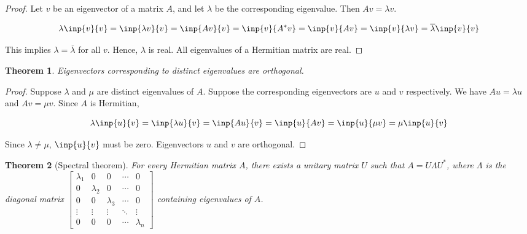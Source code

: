 \documentclass[twoside]{article}
\newcommand*\conj[1]{\overline{#1}}
\newcommand*\adj[1]{#1^*}
\theoremstyle{plain}
\newtheorem{theorem}{Theorem}
\theoremstyle{definition}
\theoremstyle{remark}
\begin{document}
\begin{proof}
Let \(v\) be an eigenvector of a matrix \(A\), and let \(\lambda\) be the corresponding eigenvalue. Then \(Av = \lambda v\). 

\[ \lambda\inp{v}{v} = \inp{\lambda v}{v} =  \inp{Av}{v} = \inp{v}{\adj{A}v} = \inp{v}{Av} = \inp{v}{\lambda v} = \conj{\lambda} \inp{v}{v}\]

This implies \(\lambda = \conj{\lambda}\) for all \(v\). Hence, \(\lambda\) is real. All eigenvalues of a Hermitian matrix are real.
 \end{proof}



\begin{theorem} Eigenvectors corresponding to distinct eigenvalues are orthogonal.\end{theorem}

\begin{proof} Suppose \(\lambda\) and \(\mu\) are distinct eigenvalues of \(A\). Suppose the corresponding eigenvectors are \(u\) and \(v\) respectively. We have \(Au = \lambda u\) and \(Av = \mu v\). Since \(A\) is Hermitian, 

\[ \lambda \inp{u}{v} = \inp{\lambda u}{v} = \inp{A u}{v} = \inp{u}{Av} = \inp{u}{\mu v} = \mu \inp{u}{v} \]

Since \(\lambda \ne \mu\), \(\inp{u}{v}\) must be zero. Eigenvectors \(u\) and \(v\) are orthogonal.

\end{proof}




\begin{theorem}[Spectral theorem]  For every Hermitian matrix \(A\), there exists a unitary matrix \(U\) such that \(A = U \Lambda \adj{U}\), where \(\Lambda\) is the diagonal matrix \(\begin{bmatrix}
\lambda_1 & 0 & 0 & \cdots & 0\\
0 & \lambda_2 & 0 & \cdots & 0\\
0 & 0 & \lambda_3 & \cdots & 0\\
\vdots & \vdots & \vdots & \ddots & \vdots \\
0 & 0 & 0 & \cdots & \lambda_n \end{bmatrix}\) containing eigenvalues of \(A\). \end{theorem}
\end{document}
